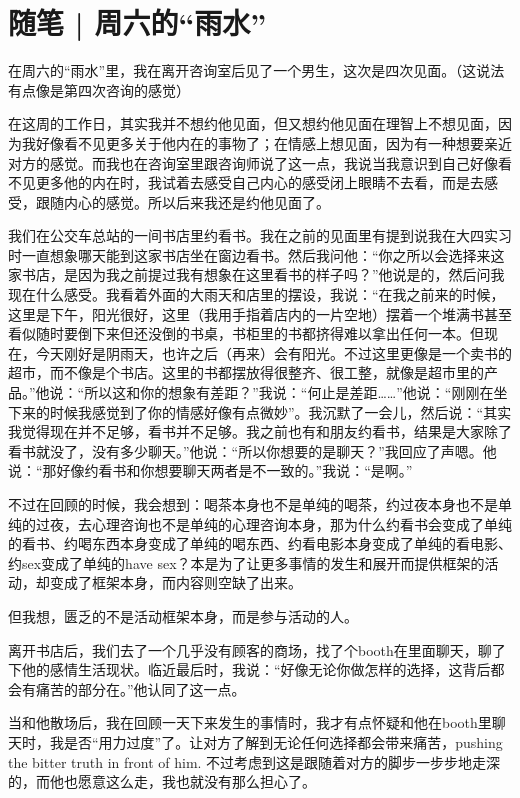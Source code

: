 \chapter{随笔 | 周六的“雨水”}


在周六的“雨水”里，我在离开咨询室后见了一个男生，这次是四次见面。（这说法有点像是第四次咨询的感觉）

在这周的工作日，其实我并不想约他见面，但又想约他见面\pozhehao{}在理智上不想见面，因为我好像看不见更多关于他内在的事物了；在情感上想见面，因为有一种想要亲近对方的感觉。而我也在咨询室里跟咨询师说了这一点，我说当我意识到自己好像看不见更多他的内在时，我试着去感受自己内心的感受\pozhehao{}闭上眼睛不去看，而是去感受，跟随内心的感觉。所以后来我还是约他见面了。


我们在公交车总站的一间书店里约看书。我在之前的见面里有提到说我在大四实习时一直想象哪天能到这家书店坐在窗边看书。然后我问他：“你之所以会选择来这家书店，是因为我之前提过我有想象在这里看书的样子吗？”他说是的，然后问我现在什么感受。我看着外面的大雨天和店里的摆设，我说：“在我之前来的时候，这里是下午，阳光很好，这里（我用手指着店内的一片空地）摆着一个堆满书甚至看似随时要倒下来但还没倒的书桌，书柜里的书都挤得难以拿出任何一本。但现在，今天刚好是阴雨天，也许之后（再来）会有阳光。不过这里更像是一个卖书的超市，而不像是个书店。这里的书都摆放得很整齐、很工整，就像是超市里的产品。”他说：“所以这和你的想象有差距？”我说：“何止是差距……”他说：“刚刚在坐下来的时候我感觉到了你的情感好像有点微妙”。我沉默了一会儿，然后说：“其实我觉得现在并不足够，看书并不足够。我之前也有和朋友约看书，结果是大家除了看书就没了，没有多少聊天。”他说：“所以你想要的是聊天？”我回应了声嗯。他说：“那好像约看书和你想要聊天两者是不一致的。”我说：“是啊。”

不过在回顾的时候，我会想到：喝茶本身也不是单纯的喝茶，约过夜本身也不是单纯的过夜，去心理咨询也不是单纯的心理咨询本身，那为什么约看书会变成了单纯的看书、约喝东西本身变成了单纯的喝东西、约看电影本身变成了单纯的看电影、约sex变成了单纯的have sex？本是为了让更多事情的发生和展开而提供框架的活动，却变成了框架本身，而内容则空缺了出来。

但我想，匮乏的不是活动框架本身，而是参与活动的人。


离开书店后，我们去了一个几乎没有顾客的商场，找了个booth在里面聊天，聊了下他的感情生活现状。临近最后时，我说：“好像无论你做怎样的选择，这背后都会有痛苦的部分在。”他认同了这一点。

当和他散场后，我在回顾一天下来发生的事情时，我才有点怀疑和他在booth里聊天时，我是否“用力过度”了。让对方了解到无论任何选择都会带来痛苦，pushing the bitter truth in front of him. 不过考虑到这是跟随着对方的脚步一步步地走深的，而他也愿意这么走，我也就没有那么担心了。


